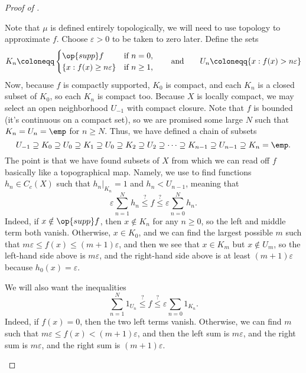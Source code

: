 \documentclass[../notes.tex]{subfiles}
\begin{document}
\begin{proof}[Proof of ]
\begin{enumerate}
		Note that $\mu$ is defined entirely topologically, we will need to use topology to approximate $f$. Choose $\varepsilon>0$ to be taken to zero later. Define the sets
		\[K_n\coloneqq\begin{cases}
			\op{supp}f & \text{if }n=0, \\
			\{x:f(x)\ge n\varepsilon\} & \text{if }n\ge1,
		\end{cases}\qquad\text{and}\qquad U_n\coloneqq\{x:f(x)>n\varepsilon\}\]
		Now, because $f$ is compactly supported, $K_0$ is compact, and each $K_n$ is a closed subset of $K_0$, so each $K_n$ is compact too. Because $X$ is locally compact, we may select an open neighborhood $U_{-1}$ with compact closure. Note that $f$ is bounded (it's continuous on a compact set), so we are promised some large $N$ such that $K_n=U_n=\emp$ for $n\ge N$. Thus, we have defined a chain of subsets
		\[U_{-1}\supseteq K_0\supseteq U_0\supseteq K_1\supseteq U_0\supseteq K_2\supseteq U_2\supseteq\cdots\supseteq K_{n-1}\supseteq U_{n-1}\supseteq K_n=\emp.\]
		The point is that we have found subsets of $X$ from which we can read off $f$ basically like a topographical map. Namely, we use  to find functions $h_n\in C_c(X)$ such that $h_n|_{K_n}=1$ and $h_n<U_{n-1}$, meaning that
		\[\varepsilon\sum_{n=1}^Nh_n\stackrel?\le f\stackrel?\le\varepsilon\sum_{n=0}^Nh_n.\]
		Indeed, if $x\notin\op{supp}f$, then $x\notin K_n$ for any $n\ge0$, so the left and middle term both vanish. Otherwise, $x\in K_0$, and we can find the largest possible $m$ such that $m\varepsilon\le f(x)\le(m+1)\varepsilon$, and then we see that $x\in K_m$ but $x\notin U_m$, so the left-hand side above is $m\varepsilon$, and the right-hand side above is at least $(m+1)\varepsilon$ because $h_0(x)=\varepsilon$.

		We will also want the inequalities
		\[\sum_{n=1}^N1_{U_n}\stackrel?\le f\stackrel?\le\varepsilon\sum_{n=0}1_{K_n}.\]
		Indeed, if $f(x)=0$, then the two left terms vanish. Otherwise, we can find $m$ such that $m\varepsilon\le f(x)<(m+1)\varepsilon$, and then the left sum is $m\varepsilon$, and the right sum is $m\varepsilon$, and the right sum is $(m+1)\varepsilon$.


\end{enumerate}
\end{proof}
\end{document}
